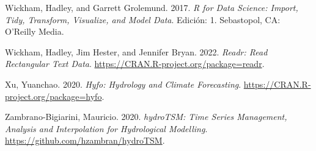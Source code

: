 \begin{CSLReferences}{1}{0}
\leavevmode{}%
Wickham, Hadley, and Garrett Grolemund. 2017. \emph{R for {Data} {Science}: {Import}, {Tidy}, {Transform}, {Visualize}, and {Model} {Data}}. Edición: 1. Sebastopol, CA: O'Reilly Media.

\leavevmode{}%
Wickham, Hadley, Jim Hester, and Jennifer Bryan. 2022. \emph{Readr: Read Rectangular Text Data}. \url{https://CRAN.R-project.org/package=readr}.

\leavevmode{}%
Xu, Yuanchao. 2020. \emph{Hyfo: Hydrology and Climate Forecasting}. \url{https://CRAN.R-project.org/package=hyfo}.

\leavevmode{}%
Zambrano-Bigiarini, Mauricio. 2020. \emph{hydroTSM: Time Series Management, Analysis and Interpolation for Hydrological Modelling}. \url{https://github.com/hzambran/hydroTSM}.

\end{CSLReferences}



\address{%
Ezequiel Toum\\
IANIGLA-CONICET\\%
Av. Ruiz Leal s/n Parque General San Martin - Mendoza\\ Argentina\\
%
%
\textit{ORCiD: \href{https://orcid.org/0000-0002-4482-0559}{0000-0002-4482-0559}}\\%
\href{mailto:etoum@mendoza-conicet.gob.ar}{\nolinkurl{etoum@mendoza-conicet.gob.ar}}%
}

\address{%
Pierre Pitte\\
IANIGLA-CONICET\\%
Av. Ruiz Leal s/n Parque General San Martin - Mendoza\\ Argentina\\
%
%
\textit{ORCiD: \href{https://orcid.org/0000-0001-5625-8287}{0000-0001-5625-8287}}\\%
\href{mailto:pierrepitte@mendoza-conicet.gob.ar}{\nolinkurl{pierrepitte@mendoza-conicet.gob.ar}}%
}
